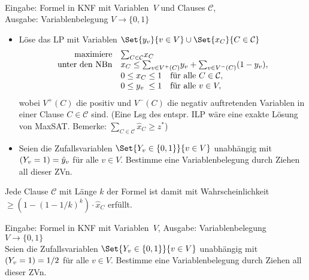 \documentclass{cheat-sheet}
\let\P\relax %
\DeclareMathOperator{\P}{P} %
\begin{document}
\begin{alg} \mbox{} \\
  Eingabe: Formel in KNF mit Variablen~$V$ und Clauses $\mathcal{C}$, \\
  Ausgabe: Variablenbelegung $V \to \{ 0, 1 \}$
  \begin{itemize}
    \item Löse das LP mit Variablen $\Set{y_v}{v \in V} \cup \Set{x_C}{C \in \mathcal{C}}$
    \[
      \begin{array}{r l}
        \text{maximiere} & {\sum}_{C \in \mathcal{C}} x_C \\
        \text{unter den NBn}
          & x_C \leq {\sum}_{v \in V^{+}(C)} y_v + {\sum}_{v \in V^{-}(C)} (1 - y_v), \\
          & 0 \leq x_C \leq 1 \quad \text{für alle } C \in \mathcal{C}, \\
          & 0 \leq \makebox[0pt][l]{$y_v$}\phantom{x_C} \leq 1 \quad \text{für alle } v \in V,
      \end{array}
    \]
    wobei $V^{+}(C)$ die positiv und $V^{-}(C)$ die negativ auftretenden Variablen in einer Clause $C \in \mathcal{C}$ sind.
    (Eine Lsg des entspr\@. ILP wäre eine exakte Lösung von MaxSAT\@.
    Bemerke: ${\sum}_{C \in \mathcal{C}} \hat{x}_C \geq z^*$)
    \item
      Seien die Zufallsvariablen $\Set{Y_v \in \{ 0, 1\}}{v \in V}$ unabhängig mit $\P(Y_v = 1) = \hat{y}_v$ für alle $v \in V$.
      Bestimme eine Variablenbelegung durch Ziehen all dieser ZVn.
  \end{itemize}
\end{alg}


\begin{lem}
  Jede Clause $\mathcal{C}$ mit Länge $k$ der Formel ist damit mit Wahrscheinlichkeit $\geq (1 - (1 - 1/k)^k) \cdot \hat{x}_C$ erfüllt.
\end{lem}

\begin{alg}
  Eingabe: Formel in KNF mit Variablen~$V$,
  Ausgabe: Variablenbelegung $V \to \{ 0, 1 \}$ \\[0.2em]
  Seien die Zufallsvariablen $\Set{Y_v \in \{ 0, 1\}}{v \in V}$ unabhängig mit $\P(Y_v = 1) = 1/2$ für alle $v \in V$.
  Bestimme eine Variablenbelegung durch Ziehen all dieser ZVn.
\end{alg}
\end{document}
